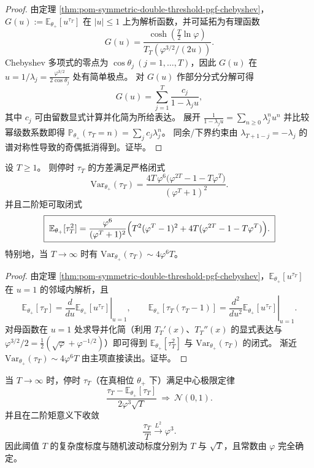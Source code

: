 \begin{proof}
由定理 \ref{thm:pom-symmetric-double-threshold-pgf-chebyshev}，
\(
G(u):=\mathbb{E}_{\theta_+}[u^{\tau_T}]
\)
在 \(|u|\le 1\) 上为解析函数，并可延拓为有理函数
\[
G(u)=\frac{\cosh(\tfrac{T}{2}\ln\varphi)}{T_T(\varphi^{3/2}/(2u))}.
\]
Chebyshev 多项式的零点为
\(
\cos\theta_j\ (j=1,\dots,T)
\)，因此 \(G(u)\) 在
\(
u=1/\lambda_j=\frac{\varphi^{3/2}}{2\cos\theta_j}
\)
处有简单极点。
对 \(G(u)\) 作部分分式分解可得
\[
G(u)=\sum_{j=1}^{T}\frac{c_j}{1-\lambda_j u},
\]
其中 \(c_j\) 可由留数显式计算并化简为所给表达。
展开 \(\frac{1}{1-\lambda_j u}=\sum_{n\ge 0}\lambda_j^n u^n\) 并比较幂级数系数即得
\(
\mathbb{P}_{\theta_+}(\tau_T=n)=\sum_j c_j\lambda_j^n
\)。
同余/下界约束由 \(\lambda_{T+1-j}=-\lambda_j\) 的谱对称性导致的奇偶抵消得到。证毕。
\end{proof}

\begin{proposition}\label{prop:pom-tau-second-moment-variance-closed}
设 \(T\ge 1\)。
则停时 \(\tau_T\) 的方差满足严格闭式
\[
\boxed{\;
\mathrm{Var}_{\theta_+}(\tau_T)
=\frac{4T\,\varphi^{6}\bigl(\varphi^{2T}-1-T\varphi^{T}\bigr)}{(\varphi^{T}+1)^2}.\;}
\]
并且二阶矩可取闭式
\[
\boxed{\;
\mathbb{E}_{\theta_+}[\tau_T^2]
=\frac{\varphi^{6}}{(\varphi^{T}+1)^2}\Bigl(T^2(\varphi^{T}-1)^2+4T(\varphi^{2T}-1-T\varphi^{T})\Bigr).\;}
\]
特别地，当 \(T\to\infty\) 时有 \(\mathrm{Var}_{\theta_+}(\tau_T)\sim 4\varphi^{6}T\)。
\end{proposition}

\begin{proof}
由定理 \ref{thm:pom-symmetric-double-threshold-pgf-chebyshev}，\(\mathbb{E}_{\theta_+}[u^{\tau_T}]\) 在 \(u=1\) 的邻域内解析，且
\[
\mathbb{E}_{\theta_+}[\tau_T]=\left.\frac{d}{du}\mathbb{E}_{\theta_+}[u^{\tau_T}]\right|_{u=1},\qquad
\mathbb{E}_{\theta_+}[\tau_T(\tau_T-1)]=\left.\frac{d^2}{du^2}\mathbb{E}_{\theta_+}[u^{\tau_T}]\right|_{u=1}.
\]
对母函数在 \(u=1\) 处求导并化简（利用 \(T_T'(x)\)、\(T_T''(x)\) 的显式表达与 \(\varphi^{3/2}/2=\tfrac12(\sqrt\varphi+\varphi^{-1/2})\)）即可得到 \(\mathbb{E}_{\theta_+}[\tau_T^2]\) 与 \(\mathrm{Var}_{\theta_+}(\tau_T)\) 的闭式。
渐近 \(\mathrm{Var}_{\theta_+}(\tau_T)\sim 4\varphi^{6}T\) 由主项直接读出。证毕。
\end{proof}

\begin{theorem}\label{thm:pom-tau-clt-large-threshold}
当 \(T\to\infty\) 时，停时 \(\tau_T\)（在真相位 \(\theta_+\) 下）满足中心极限定律
\[
\boxed{\;
\frac{\tau_T-\mathbb{E}_{\theta_+}[\tau_T]}{2\varphi^{3}\sqrt{T}}\ \Longrightarrow\ \mathcal{N}(0,1).\;}
\]
并且在二阶矩意义下收敛
\[
\boxed{\;\frac{\tau_T}{T}\xrightarrow{L^2}\varphi^{3}.\;}
\]
因此阈值 \(T\) 的复杂度标度与随机波动标度分别为 \(T\) 与 \(\sqrt{T}\)，且常数由 \(\varphi\) 完全确定。
\end{theorem}

